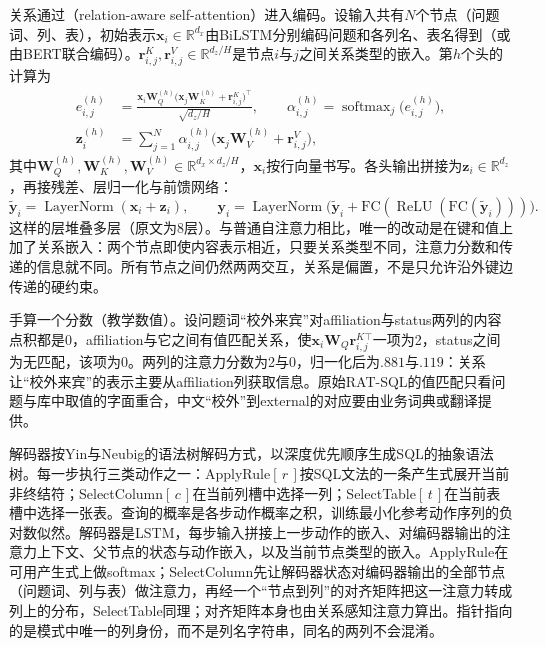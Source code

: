 关系通过（relation-aware self-attention）进入编码。设输入共有$N$个节点（问题词、列、表），初始表示$\bm x_i\in\mathbb R^{d_x}$由BiLSTM分别编码问题和各列名、表名得到（或由BERT联合编码）。$\bm r^K_{i,j},\bm r^V_{i,j}\in\mathbb R^{d_z/H}$是节点$i$与$j$之间关系类型的嵌入。第$h$个头的计算为
\begin{equation}
 \begin{aligned}
  e^{(h)}_{i,j}&=\frac{\bm x_i\bm W^{(h)}_Q\bigl(\bm x_j\bm W^{(h)}_K+\bm r^K_{i,j}\bigr)^{\top}}{\sqrt{d_z/H}},\qquad
  \alpha^{(h)}_{i,j}=\operatorname{softmax}_j\bigl(e^{(h)}_{i,j}\bigr),\\
  \bm z^{(h)}_i&=\sum_{j=1}^{N}\alpha^{(h)}_{i,j}\bigl(\bm x_j\bm W^{(h)}_V+\bm r^V_{i,j}\bigr),
 \end{aligned}
 \label{eq:nlp-analysis-rat-attention}
\end{equation}
其中$\bm W^{(h)}_Q,\bm W^{(h)}_K,\bm W^{(h)}_V\in\mathbb R^{d_x\times d_z/H}$，$\bm x_i$按行向量书写。各头输出拼接为$\bm z_i\in\mathbb R^{d_z}$，再接残差、层归一化与前馈网络：
\[
 \tilde{\bm y}_i=\operatorname{LayerNorm}(\bm x_i+\bm z_i),\qquad
 \bm y_i=\operatorname{LayerNorm}\bigl(\tilde{\bm y}_i+\mathrm{FC}(\operatorname{ReLU}(\mathrm{FC}(\tilde{\bm y}_i)))\bigr).
\]
这样的层堆叠多层（原文为8层）。与普通自注意力相比，唯一的改动是在键和值上加了关系嵌入：两个节点即使内容表示相近，只要关系类型不同，注意力分数和传递的信息就不同。所有节点之间仍然两两交互，关系是偏置，不是只允许沿外键边传递的硬约束。

手算一个分数（教学数值）。设问题词“校外来宾”对affiliation与status两列的内容点积都是0，affiliation与它之间有值匹配关系，使$\bm x_i\bm W_Q\bm r^{K\top}_{i,j}$一项为2，status之间为无匹配，该项为0。两列的注意力分数为2与0，归一化后为$.881$与$.119$：关系让“校外来宾”的表示主要从affiliation列获取信息。原始RAT-SQL的值匹配只看问题与库中取值的字面重合，中文“校外”到external的对应要由业务词典或翻译提供。

解码器按Yin与Neubig的语法树解码方式，以深度优先顺序生成SQL的抽象语法树。每一步执行三类动作之一：ApplyRule$[\,r\,]$按SQL文法的一条产生式展开当前非终结符；SelectColumn$[\,c\,]$在当前列槽中选择一列；SelectTable$[\,t\,]$在当前表槽中选择一张表。查询的概率是各步动作概率之积，训练最小化参考动作序列的负对数似然。解码器是LSTM，每步输入拼接上一步动作的嵌入、对编码器输出的注意力上下文、父节点的状态与动作嵌入，以及当前节点类型的嵌入。ApplyRule在可用产生式上做softmax；SelectColumn先让解码器状态对编码器输出的全部节点（问题词、列与表）做注意力，再经一个“节点到列”的对齐矩阵把这一注意力转成列上的分布，SelectTable同理；对齐矩阵本身也由关系感知注意力算出。指针指向的是模式中唯一的列身份，而不是列名字符串，同名的两列不会混淆。

